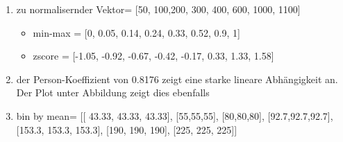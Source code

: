 \begin{enumerate}
	\item zu normalisernder Vektor= [50, 100,200, 300, 400, 600, 1000, 1100]
	\begin{itemize}
		\item min-max = [0, 0.05, 0.14, 0.24, 0.33, 0.52, 0.9, 1]
		\item zscore = [-1.05, -0.92, -0.67, -0.42, -0.17, 0.33, 1.33, 1.58]
	\end{itemize}
	\item der Person-Koeffizient von 0.8176 zeigt eine starke lineare Abhängigkeit an. Der Plot unter Abbildung zeigt dies ebenfalls %
	\item bin by mean= [[ 43.33, 43.33, 43.33], [55,55,55], [80,80,80], [92.7,92.7,92.7], [153.3, 153.3, 153.3], [190, 190, 190], [225, 225, 225]]

\end{enumerate}
